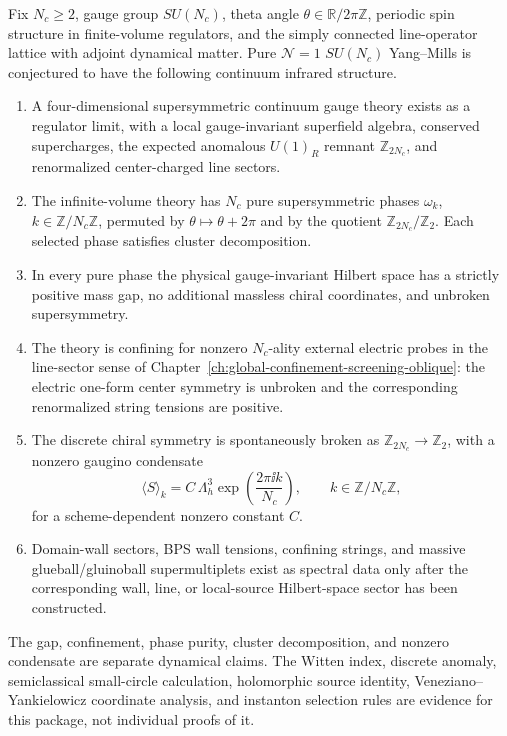 \begin{conjecture}[Central Conjecture (Pure \(\mathcal N=1\) supersymmetric Yang--Mills)]
\label{conj:pure-n1-sym-central}
Fix \(N_c\ge2\), gauge group \(SU(N_c)\), theta angle
\(\theta\in\mathbb R/2\pi\mathbb Z\), periodic spin structure in finite-volume
regulators, and the simply connected line-operator lattice with adjoint
dynamical matter.  Pure \(\mathcal N=1\) \(SU(N_c)\) Yang--Mills is conjectured
to have the following continuum infrared structure.
\begin{enumerate}[label=(\roman*)]
\item A four-dimensional supersymmetric continuum gauge theory exists as a
  regulator limit, with a local gauge-invariant superfield algebra, conserved
  supercharges, the expected anomalous \(U(1)_R\) remnant
  \(\mathbb Z_{2N_c}\), and renormalized center-charged line sectors.
\item The infinite-volume theory has \(N_c\) pure supersymmetric phases
  \(\omega_k\), \(k\in\mathbb Z/N_c\mathbb Z\), permuted by
  \(\theta\mapsto\theta+2\pi\) and by the quotient
  \(\mathbb Z_{2N_c}/\mathbb Z_2\).  Each selected phase satisfies cluster
  decomposition.
\item In every pure phase the physical gauge-invariant Hilbert space has a
  strictly positive mass gap, no additional massless chiral coordinates, and
  unbroken supersymmetry.
\item The theory is confining for nonzero \(N_c\)-ality external electric probes
  in the line-sector sense of
  Chapter~\ref{ch:global-confinement-screening-oblique}: the electric one-form
  center symmetry is unbroken and the corresponding renormalized string
  tensions are positive.
\item The discrete chiral symmetry is spontaneously broken as
  \(\mathbb Z_{2N_c}\to\mathbb Z_2\), with a nonzero gaugino condensate
  \begin{equation}
    \langle S\rangle_k
    =
    C\,\Lambda_h^3\exp\!\left(\frac{2\pi\ii k}{N_c}\right),
    \qquad k\in\mathbb Z/N_c\mathbb Z,
    \label{eq:pure-sym-central-condensate-orbit}
  \end{equation}
  for a scheme-dependent nonzero constant \(C\).
\item Domain-wall sectors, BPS wall tensions, confining strings, and massive
  glueball/gluinoball supermultiplets exist as spectral data only after the
  corresponding wall, line, or local-source Hilbert-space sector has been
  constructed.
\end{enumerate}
The gap, confinement, phase purity, cluster decomposition, and nonzero
condensate are separate dynamical claims.  The Witten index, discrete anomaly,
semiclassical small-circle calculation, holomorphic source identity,
Veneziano--Yankielowicz coordinate analysis, and instanton selection rules are
evidence for this package, not individual proofs of it.
\end{conjecture}

